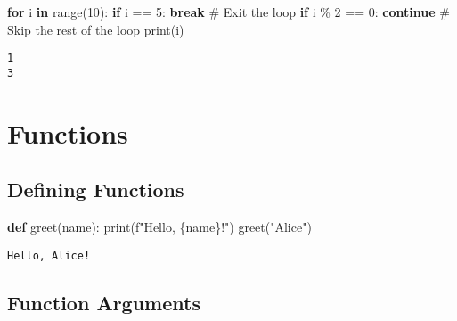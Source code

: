 \documentclass[
  letterpaper,
  DIV=11,
  numbers=noendperiod]{scrreprt}
\newenvironment{Shaded}{\begin{snugshade}}{\end{snugshade}}
\newcommand{\BuiltInTok}[1]{\textcolor[rgb]{0.00,0.23,0.31}{#1}}
\newcommand{\CommentTok}[1]{\textcolor[rgb]{0.37,0.37,0.37}{#1}}
\newcommand{\ControlFlowTok}[1]{\textcolor[rgb]{0.00,0.23,0.31}{\textbf{#1}}}
\newcommand{\DecValTok}[1]{\textcolor[rgb]{0.68,0.00,0.00}{#1}}
\newcommand{\KeywordTok}[1]{\textcolor[rgb]{0.00,0.23,0.31}{\textbf{#1}}}
\newcommand{\NormalTok}[1]{\textcolor[rgb]{0.00,0.23,0.31}{#1}}
\newcommand{\OperatorTok}[1]{\textcolor[rgb]{0.37,0.37,0.37}{#1}}
\newcommand{\SpecialCharTok}[1]{\textcolor[rgb]{0.37,0.37,0.37}{#1}}
\newcommand{\SpecialStringTok}[1]{\textcolor[rgb]{0.13,0.47,0.30}{#1}}
\newcommand{\StringTok}[1]{\textcolor[rgb]{0.13,0.47,0.30}{#1}}
\begin{document}
\begin{Shaded}
\begin{Highlighting}[]
\ControlFlowTok{for}\NormalTok{ i }\KeywordTok{in} \BuiltInTok{range}\NormalTok{(}\DecValTok{10}\NormalTok{):}
    \ControlFlowTok{if}\NormalTok{ i }\OperatorTok{==} \DecValTok{5}\NormalTok{:}
        \ControlFlowTok{break}  \CommentTok{\# Exit the loop}
    \ControlFlowTok{if}\NormalTok{ i }\OperatorTok{\%} \DecValTok{2} \OperatorTok{==} \DecValTok{0}\NormalTok{:}
        \ControlFlowTok{continue}  \CommentTok{\# Skip the rest of the loop}
    \BuiltInTok{print}\NormalTok{(i)}
\end{Highlighting}
\end{Shaded}

\begin{verbatim}
1
3
\end{verbatim}

\section{Functions}\label{functions-1}

\subsection{Defining Functions}\label{defining-functions}

\begin{Shaded}
\begin{Highlighting}[]
\KeywordTok{def}\NormalTok{ greet(name):}
    \BuiltInTok{print}\NormalTok{(}\SpecialStringTok{f"Hello, }\SpecialCharTok{\{}\NormalTok{name}\SpecialCharTok{\}}\SpecialStringTok{!"}\NormalTok{)}
\NormalTok{greet(}\StringTok{"Alice"}\NormalTok{)}
\end{Highlighting}
\end{Shaded}

\begin{verbatim}
Hello, Alice!
\end{verbatim}

\subsection{Function Arguments}\label{function-arguments}
\end{document}
